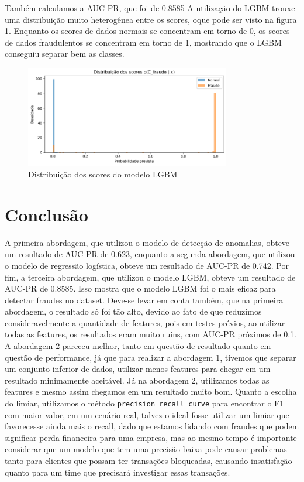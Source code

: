 \documentclass[a4paper,12pt]{article}
\begin{document}
Também calculamos a AUC-PR, que foi de 0.8585
A utilização do LGBM trouxe uma distribuição muito heterogênea entre os scores, oque pode ser visto na figura \ref{fig:distribuicao_scores_lgbm}. Enquanto os scores de dados normais se concentram em torno de 0, os scores de dados fraudulentos se concentram em torno de 1, mostrando que o LGBM conseguiu separar bem as classes.
\begin{figure}[H]
    \centering
    \includegraphics[width=0.8\textwidth]{../output/distribuicao scores lgbm.png}
    \caption{Distribuição dos scores do modelo LGBM}
    \label{fig:distribuicao_scores_lgbm}
\end{figure}

\section{Conclusão}
\label{sec:conclusao}
A primeira abordagem, que utilizou o modelo de detecção de anomalias, obteve um resultado de AUC-PR de 0.623, enquanto a segunda abordagem, que utilizou o modelo de regressão logística, obteve um resultado de AUC-PR de 0.742. Por fim, a terceira abordagem, que utilizou o modelo LGBM, obteve um resultado de AUC-PR de 0.8585. Isso mostra que o modelo LGBM foi o mais eficaz para detectar fraudes no dataset. Deve-se levar em conta também, que na primeira abordagem, o resultado só foi tão alto, devido ao fato de que reduzimos consideravelmente a quantidade de features, pois em testes prévios, ao utilizar todas as features, os resultados eram muito ruins, com AUC-PR próximos de 0.1. A abordagem 2 pareceu melhor, tanto em questão de resultado quanto em questão de performance, já que para realizar a abordagem 1, tivemos que separar um conjunto inferior de dados, utilizar menos features para chegar em um resultado minimamente aceitável. Já na abordagem 2, utilizamos todas as features e mesmo assim chegamos em um resultado muito bom. Quanto a escolha do limiar, utilizamos o método \texttt{precision\_recall\_curve} para encontrar o F1 com maior valor, em um cenário real, talvez o ideal fosse utilizar um limiar que favorecesse ainda mais o recall, dado que estamos lidando com fraudes que podem significar perda financeira para uma empresa, mas ao mesmo tempo é importante considerar que um modelo que tem uma precisão baixa pode causar problemas tanto para clientes que possam ter transações bloqueadas, causando insatisfação quanto para um time que precisará investigar essas transações.
\end{document}
